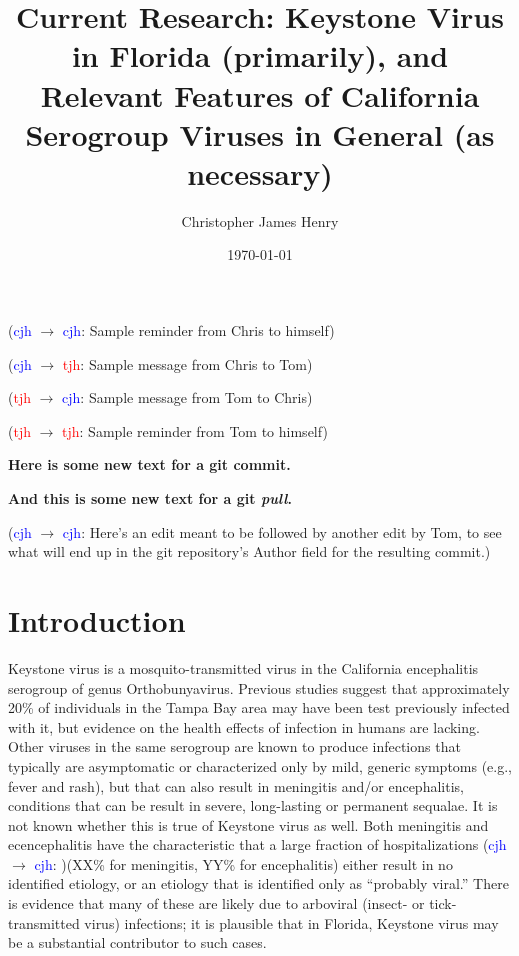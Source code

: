 \documentclass[12pt]{article}
\title%
{Current Research: Keystone Virus in Florida (primarily), and Relevant Features of California Serogroup Viruses in General (as necessary)}
\author%
{Christopher James Henry}
\date{\today}
\newcommand{\cjh}{\textcolor{blue}{cjh}}
\newcommand{\tjh}{\textcolor{red}{tjh}}
\newcommand{\msg}[3]{(#1 $\rightarrow$ #2: #3)}
\newcommand{\mcc}[1]{\msg\cjh\cjh{#1}}
\newcommand{\mct}[1]{\msg\cjh\tjh{#1}}
\newcommand{\mtc}[1]{\msg\tjh\cjh{#1}}
\newcommand{\mtt}[1]{\msg\tjh\tjh{#1}}
\begin{document}
    \titlepage
    
    \mcc{Sample reminder from Chris to himself} 

    \mct{Sample message from Chris to Tom} 

    \mtc{Sample message from Tom to Chris} 

    \mtt{Sample reminder from Tom to himself} 


    \textbf{Here is some new text for a git commit.}
    
    \textbf{And this is some new text for a git \textit{pull}.}
    
    \mcc{Here's an edit meant to be followed by another edit by Tom, to see what will end up in the git repository's Author field for the resulting commit.}

    \section{Introduction}
        Keystone virus is a mosquito-transmitted virus in the California encephalitis serogroup of genus Orthobunyavirus. Previous studies suggest that approximately 20\% of individuals in the Tampa Bay area may have been test previously infected with it, but evidence on the health effects of infection in humans are lacking. Other viruses in the same serogroup are known to produce infections that typically are asymptomatic or characterized only by mild, generic symptoms (e.g., fever and rash), but that can also result in meningitis and/or encephalitis, conditions that can be result in severe, long-lasting or permanent sequalae. It is not known whether this is true of Keystone virus as well. Both meningitis and ecencephalitis have the characteristic that a large fraction of hospitalizations \mcc{}(XX\% for meningitis, YY\% for encephalitis) either result in no identified etiology, or an etiology that is identified only as ``probably viral.'' There is evidence that many of these are likely due to arboviral (insect- or tick-transmitted virus) infections; it is plausible that in Florida, Keystone virus may be a substantial contributor to such cases.
\end{document}
